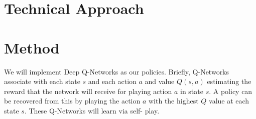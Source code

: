 \documentclass[10pt,twocolumn,letterpaper]{article}
\begin{document}
\section{Technical Approach}

\section{Method} We will implement Deep Q-Networks as our policies. Briefly,
Q-Networks associate with each state $s$ and each action $a$ and value $Q(s, a)$
estimating the reward that the network will receive for playing action $a$ in
state $s$. A policy can be recovered from this by playing the action $a$ with
the highest $Q$ value at each state $s$. These Q-Networks will learn via self-
play.



{\small


}
\end{document}
